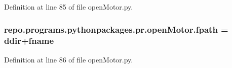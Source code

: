 Definition at line 85 of file open\-Motor.\-py.

\hypertarget{namespacerepo_1_1programs_1_1pythonpackages_1_1pr_1_1openMotor_aa622e663d644f1b366ed96d4f2b34cf2}{
\subsubsection[{fpath}]{\setlength{\rightskip}{0pt plus 5cm}repo.\-programs.\-pythonpackages.\-pr.\-open\-Motor.\-fpath = {\bf ddir}+{\bf fname}}}\label{namespacerepo_1_1programs_1_1pythonpackages_1_1pr_1_1openMotor_aa622e663d644f1b366ed96d4f2b34cf2}


Definition at line 86 of file open\-Motor.\-py.

